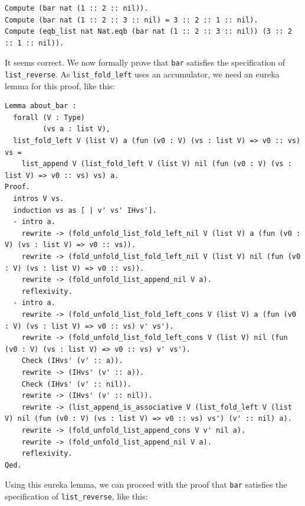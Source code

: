 \documentclass{article}
\begin{document}
\begin{lstlisting}
Compute (bar nat (1 :: 2 :: nil)).
Compute (bar nat (1 :: 2 :: 3 :: nil) = 3 :: 2 :: 1 :: nil).
Compute (eqb_list nat Nat.eqb (bar nat (1 :: 2 :: 3 :: nil)) (3 :: 2 :: 1 :: nil)).
\end{lstlisting}

It seems correct. We now formally prove that \texttt{bar} satisfies the specification of \texttt{list\_reverse}. As \texttt{list\_fold\_left} uses an accumulator, we need an eureka lemma for this proof, like this:

\begin{lstlisting}
Lemma about_bar :
  forall (V : Type)
         (vs a : list V),
  list_fold_left V (list V) a (fun (v0 : V) (vs : list V) => v0 :: vs) vs =
    list_append V (list_fold_left V (list V) nil (fun (v0 : V) (vs : list V) => v0 :: vs) vs) a.
Proof.
  intros V vs.
  induction vs as [ | v' vs' IHvs'].
  - intro a.
    rewrite -> (fold_unfold_list_fold_left_nil V (list V) a (fun (v0 : V) (vs : list V) => v0 :: vs)).
    rewrite -> (fold_unfold_list_fold_left_nil V (list V) nil (fun (v0 : V) (vs : list V) => v0 :: vs)).
    rewrite -> (fold_unfold_list_append_nil V a).
    reflexivity.
  - intro a.
    rewrite -> (fold_unfold_list_fold_left_cons V (list V) a (fun (v0 : V) (vs : list V) => v0 :: vs) v' vs').
    rewrite -> (fold_unfold_list_fold_left_cons V (list V) nil (fun (v0 : V) (vs : list V) => v0 :: vs) v' vs').
    Check (IHvs' (v' :: a)).
    rewrite -> (IHvs' (v' :: a)).
    Check (IHvs' (v' :: nil)).
    rewrite -> (IHvs' (v' :: nil)).
    rewrite -> (list_append_is_associative V (list_fold_left V (list V) nil (fun (v0 : V) (vs : list V) => v0 :: vs) vs') (v' :: nil) a).
    rewrite -> (fold_unfold_list_append_cons V v' nil a).
    rewrite -> (fold_unfold_list_append_nil V a).
    reflexivity.
Qed.
\end{lstlisting}

Using this eureka lemma, we can proceed with the proof that \texttt{bar} satisfies the specification of \texttt{list\_reverse}, like this:
\end{document}
